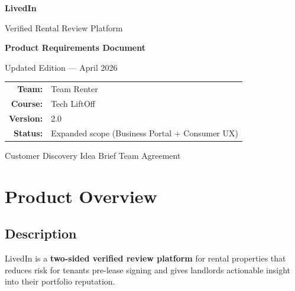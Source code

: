 \documentclass[11pt,letterpaper]{article}
\begin{document}
\begin{titlepage}
\centering
\vspace*{2cm}

{\Huge\bfseries\textcolor{brandpurple}{LivedIn}\par}
\vspace{0.5cm}
{\Large\textcolor{textprimary}{Verified Rental Review Platform}\par}
\vspace{2cm}

{\LARGE\bfseries Product Requirements Document\par}
\vspace{0.5cm}
{\large Updated Edition --- April 2026\par}
\vspace{3cm}

\begin{tabular}{r l}
\textbf{Team:}     & Team Renter \\
\textbf{Course:}   & Tech LiftOff \\
\textbf{Version:}  & 2.0 \\
\textbf{Status:}   & Expanded scope (Business Portal + Consumer UX) \\
\end{tabular}

\vfill
{\small Customer Discovery \textbar{} Idea Brief \textbar{} Team Agreement\par}
\end{titlepage}

\tableofcontents
\newpage

\section{Product Overview}

\subsection{Description}

LivedIn is a \textbf{two-sided verified review platform} for rental properties that reduces risk for tenants pre-lease signing and gives landlords actionable insight into their portfolio reputation.
\end{document}
